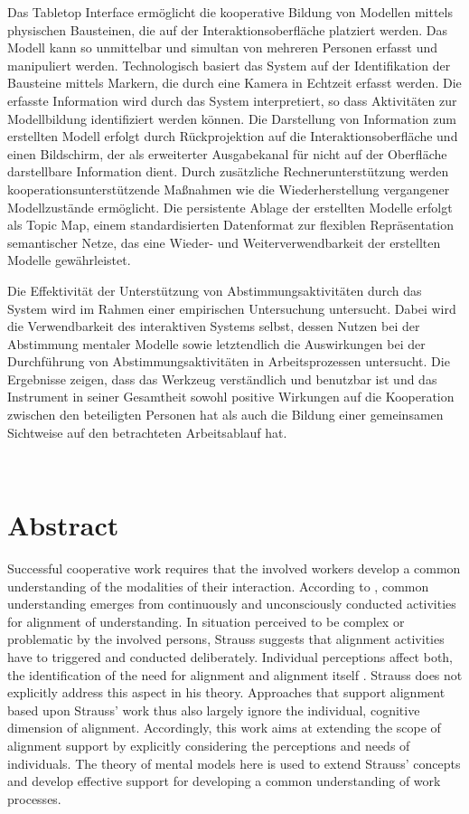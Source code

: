Das Tabletop Interface ermöglicht die kooperative Bildung von Modellen mittels physischen Bausteinen, die auf der Interaktionsoberfläche platziert werden. Das Modell kann so unmittelbar und simultan von mehreren Personen erfasst und manipuliert werden. Technologisch basiert das System auf der Identifikation der Bausteine mittels Markern, die durch eine Kamera in Echtzeit erfasst werden. Die erfasste Information wird durch das System interpretiert, so dass Aktivitäten zur Modellbildung identifiziert werden können. Die Darstellung von Information zum erstellten Modell erfolgt durch Rückprojektion auf die Interaktionsoberfläche und einen Bildschirm, der als erweiterter Ausgabekanal für nicht auf der Oberfläche darstellbare Information dient. Durch zusätzliche Rechnerunterstützung werden kooperationsunterstützende Maßnahmen wie die Wiederherstellung vergangener Modellzustände ermöglicht. Die persistente Ablage der erstellten Modelle erfolgt als Topic Map, einem standardisierten Datenformat zur flexiblen Repräsentation semantischer Netze, das eine Wieder- und Weiterverwendbarkeit der erstellten Modelle gewährleistet.

Die Effektivität der Unterstützung von Abstimmungsaktivitäten durch das System wird im Rahmen einer empirischen Untersuchung untersucht. Dabei wird die Verwendbarkeit des interaktiven Systems selbst, dessen Nutzen bei der Abstimmung mentaler Modelle sowie letztendlich die Auswirkungen bei der Durchführung von Abstimmungsaktivitäten in Arbeitsprozessen untersucht. Die Ergebnisse zeigen, dass das Werkzeug verständlich und benutzbar ist und das Instrument in seiner Gesamtheit sowohl positive Wirkungen auf die Kooperation zwischen den beteiligten Personen hat als auch die Bildung einer gemeinsamen Sichtweise auf den betrachteten Arbeitsablauf hat.

\newpage
\textcolor{white}
.
\textcolor{black}
\newpage
 
\cleardoublepage

\section*{Abstract}
Successful cooperative work requires that the involved workers develop a common understanding of the modalities of their interaction. According to \citet{Strauss85}, common understanding emerges from continuously and unconsciously conducted activities for alignment of understanding. In situation perceived to be complex or problematic by the involved persons, Strauss suggests that alignment activities have to triggered and conducted deliberately. Individual perceptions affect both, the identification of the need for alignment and alignment itself \citep{Grudin88}. Strauss does not explicitly address this aspect in his theory. Approaches that support alignment based upon Strauss' work thus also largely ignore the individual, cognitive dimension of alignment. Accordingly, this work aims at extending the scope of alignment support by explicitly considering the perceptions and needs of individuals. The theory of mental models \citep{Johnson-Laird81} here is used to extend Strauss' concepts and develop effective support for developing a common understanding of work processes.

